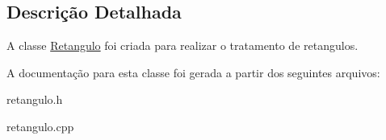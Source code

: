 \subsection{Descrição Detalhada}
A classe \hyperlink{class_retangulo}{Retangulo} foi criada para realizar o tratamento de retangulos. 

A documentação para esta classe foi gerada a partir dos seguintes arquivos\+:\begin{DoxyCompactItemize}
\item 
retangulo.\+h\item 
retangulo.\+cpp\end{DoxyCompactItemize}
